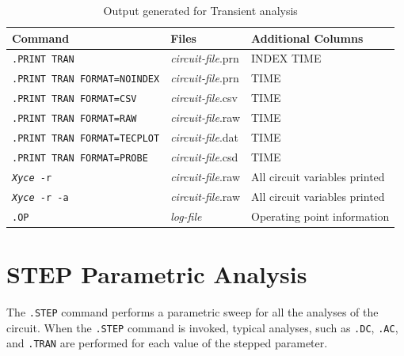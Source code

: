\begin{table}[htbp]
  \caption{Output generated for Transient analysis \label{Tran_Output_table}}
  \begin{tabularx}{\linewidth}{|p{2.75in}|Y|Y|}
     \color{white}\textbf{Command} & \color{white}\textbf{Files} & \color{white}\textbf{Additional Columns} \\ \hline
\texttt{.PRINT TRAN} & \emph{circuit-file}.prn & INDEX TIME \\ \hline
\texttt{.PRINT TRAN FORMAT=NOINDEX} & \emph{circuit-file}.prn & TIME \\ \hline
\texttt{.PRINT TRAN FORMAT=CSV} & \emph{circuit-file}.csv & TIME \\ \hline
\texttt{.PRINT TRAN FORMAT=RAW} & \emph{circuit-file}.raw & TIME \\ \hline
\texttt{.PRINT TRAN FORMAT=TECPLOT} & \emph{circuit-file}.dat & TIME \\ \hline
\texttt{.PRINT TRAN FORMAT=PROBE} & \emph{circuit-file}.csd & TIME \\ \hline

\texttt{\emph{Xyce} -r} & \emph{circuit-file}.raw & All circuit variables printed \\ \hline
\texttt{\emph{Xyce} -r -a} & \emph{circuit-file}.raw & All circuit variables printed \\ \hline

\texttt{.OP} & \emph{log-file} & Operating point information \\ \hline

  \end{tabularx}
\end{table}

\clearpage
\section{STEP Parametric Analysis}
\label{STEP_Analysis}
\label{step_Overview}
 

The \verb|.STEP| command performs a parametric sweep for all the
analyses of the circuit.  When the \verb|.STEP| command is invoked,
typical analyses, such as \verb|.DC|, \verb|.AC|, and \verb|.TRAN| are
performed for each value of the stepped parameter.

